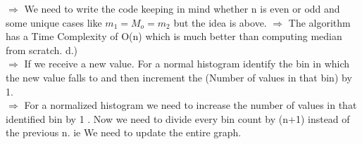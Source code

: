 \documentclass[12pt]{article}
\begin{document}
$\Rightarrow$ We need to write the code keeping in mind whether n is even or odd and some unique cases like $m_1=M_o=m_2$ but the idea is above.
\newline
$\Rightarrow$ The algorithm has a Time Complexity of O(n) which is much better than computing median from scratch.
\newline \newline
d.) \\
$\Rightarrow$ If we receive a new value. For a normal histogram identify the bin in which the new value falls to and then increment the (Number of values in that bin) by 1. \\
$\Rightarrow$ For a normalized histogram we need to increase the {number of values in that identified bin} by 1 . Now we need to divide every bin count by (n+1) instead of the previous n. ie We need to update the entire graph.

\newpage
\end{document}
